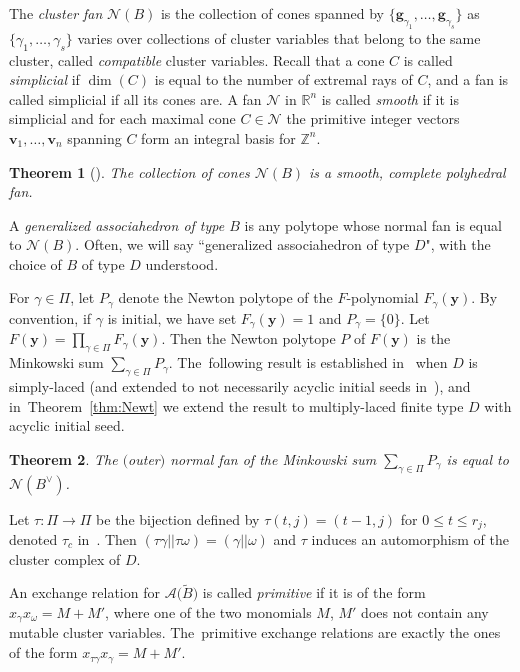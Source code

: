 \documentclass[pdftex]{sigma}%
\def\R{{\mathbb R}}
\def\Z{{\mathbb Z}}
\def\A{{\mathcal{A}}}
\def\tB{{\tilde B}}
\def\tB{{\tilde B}}
\def\y{{\mathbf y}}
\def\v{{\mathbf v}}
\def\N{{\mathcal{N}}}
\def\g{{\mathbf g}}
\numberwithin{equation}{section}
\newtheorem{Theorem}{Theorem}[section]
\begin{document}
\bigskip{}
The {\it cluster fan} $\N(B)$ is the collection of cones spanned by $\{\g_{\gamma_1},\dots,\g_{\gamma_s}\}$ as $\{\gamma_1,\dots,\gamma_s\}$ varies over collections of cluster variables that belong to the same cluster, called {\it compatible} cluster variables. Recall that a cone $C$ is called {\it simplicial} if $\dim(C)$ is equal to the number of extremal rays of $C$, and a fan is called simplicial if all its cones are. A fan $\N$ in $\R^n$ is called {\it smooth} if it is simplicial and for each maximal cone $C \in \N$ the primitive integer vectors $\v_1,\dots,\v_n$ spanning $C$ form an integral basis for $\Z^n$.

\begin{Theorem}[{\cite{CFZ,FZY,HLT}}]\label{thm:clusterfan}
The collection of cones $\N(B)$ is a smooth, complete polyhedral fan.
\end{Theorem}

A \emph{generalized associahedron of type $B$} is any polytope whose normal fan is equal to $\N(B)$.
Often, we will say ``generalized associahedron of type $D$", with the choice of $B$ of type $D$ understood.

\bigskip{}
For $\gamma \in \Pi$, let $P_\gamma$ denote the Newton polytope of the $F$-polynomial $F_\gamma(\y)$. By convention, if $\gamma$ is initial, we have set $F_\gamma(\y) = 1$ and $P_\gamma = \{0\}$. Let~$F(\y) = \prod_{\gamma \in \Pi} F_\gamma(\y)$. Then the Newton polytope $P$ of $F(\y)$ is the Minkowski sum $\sum_{\gamma \in \Pi} P_\gamma$. The~following result is established in~\cite{BDMTY} when $D$ is simply-laced (and extended to not necessarily acyclic initial seeds in~\cite{Fei2}), and in~Theorem~\ref{thm:Newt} we extend the result to multiply-laced finite type $D$ with acyclic initial seed.

\begin{Theorem}\label{thm:FNewton}
The $($outer$)$ normal fan of the Minkowski sum $\sum_{\gamma \in \Pi} P_\gamma$ is equal to $\N(B^\vee)$.
\end{Theorem}

\medskip{} %
Let $\tau\colon \Pi \to \Pi$ be the bijection defined by $\tau(t,j) = (t-1,j)$ for $0 \leq t \leq r_j$, denoted $\tau_c$ in~\cite{YZ}. Then $(\tau \gamma|| \tau \omega) = (\gamma|| \omega)$ and $\tau$ induces an automorphism of the cluster complex of $D$.

An exchange relation for $\A\big(\tB\big)$ is called \emph{primitive} if it is of the form $x_\gamma x_{\omega} = M + M'$, where one of the two monomials $M$, $M'$ does not contain any mutable cluster variables. The~primitive exchange relations are exactly the ones of the form $x_{\tau \gamma} x_{\gamma} = M + M'$.
\end{document}
